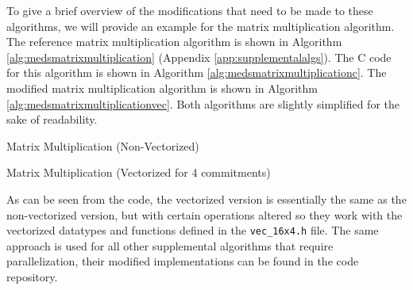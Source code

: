\documentclass[11pt,a4paper]{report}
\theoremstyle{definition}
\begin{document}
To give a brief overview of the modifications that need to be made to these algorithms, we will provide an example for the matrix multiplication algorithm. The reference matrix multiplication algorithm is shown in Algorithm \ref{alg:medsmatrixmultiplication} (Appendix \ref{app:supplementalalgs}). The C code for this algorithm is shown in Algorithm \ref{alg:medsmatrixmultiplicationc}. The modified matrix multiplication algorithm is shown in Algorithm \ref{alg:medsmatrixmultiplicationvec}. Both algorithms are slightly simplified for the sake of readability.

\begin{algorithm}
  \caption{Matrix Multiplication (Non-Vectorized)}
  \label{alg:medsmatrixmultiplicationc}
  
\end{algorithm}

\begin{algorithm}
  \caption{Matrix Multiplication (Vectorized for 4 commitments)}
  \label{alg:medsmatrixmultiplicationvec}
  
\end{algorithm}

As can be seen from the code, the vectorized version is essentially the same as the non-vectorized version, but with certain operations altered so they work with the vectorized datatypes and functions defined in the \texttt{vec\_16x4.h} file. The same approach is used for all other supplemental algorithms that require parallelization, their modified implementations can be found in the code repository.
\end{document}
